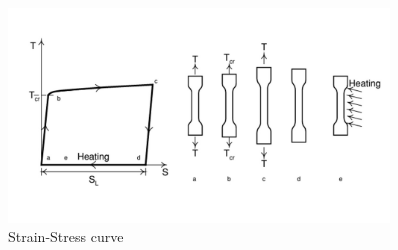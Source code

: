 \documentclass[a4paper]{tufte-handout} %
\begin{document}
\begin{figure}[ht!]
    \includegraphics[width=0.9\textwidth]{imgs/SMAcurve.jpg}
    \caption{Strain-Stress curve}\label{fig:hmk2}
\end{figure}
\end{document}
